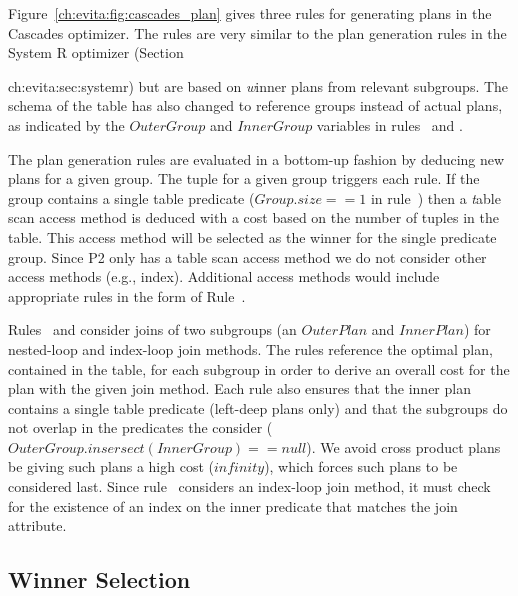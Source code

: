 Figure~\ref{ch:evita:fig:cascades_plan} gives three rules for generating plans
in the Cascades optimizer.  The rules are very similar to the plan generation
rules in the System R optimizer (Section{ch:evita:sec:systemr) but are based on
{\emph winner} plans from relevant subgroups.  The schema of the 
table has also changed to reference groups instead of actual plans, as
indicated by the $OuterGroup$ and $InnerGroup$ variables in rules~ and
.

The plan generation rules are evaluated in a bottom-up fashion by deducing new
plans for a given group.  The  tuple for a given group triggers
each rule.  If the group contains a single table predicate ($Group.size == 1$
in rule~) then a {\emph table scan} access method is deduced with a cost based
on the number of tuples in the table.  This access method will be selected as
the winner for the single predicate group.  Since P2 only has a table scan
access method we do not consider other access methods (e.g., index).
Additional access methods would include appropriate rules in the form of
Rule~.

Rules~ and  consider joins of two subgroups (an $OuterPlan$ and
$InnerPlan$) for nested-loop and index-loop join methods.  The rules reference
the optimal plan, contained in the  table, for each subgroup in
order to derive an overall cost for the plan with the given join method.  Each
rule also ensures that the inner plan contains a single table predicate
(left-deep plans only) and that the subgroups do not overlap in the predicates
the consider ($OuterGroup.insersect(InnerGroup) == null$).  We avoid cross
product plans be giving such plans a high cost ($infinity$), which forces such
plans to be considered last.  Since rule~ considers an index-loop join
method, it must check for the existence of an index on the inner predicate that
matches the join attribute.

\subsection{Winner Selection}

}
